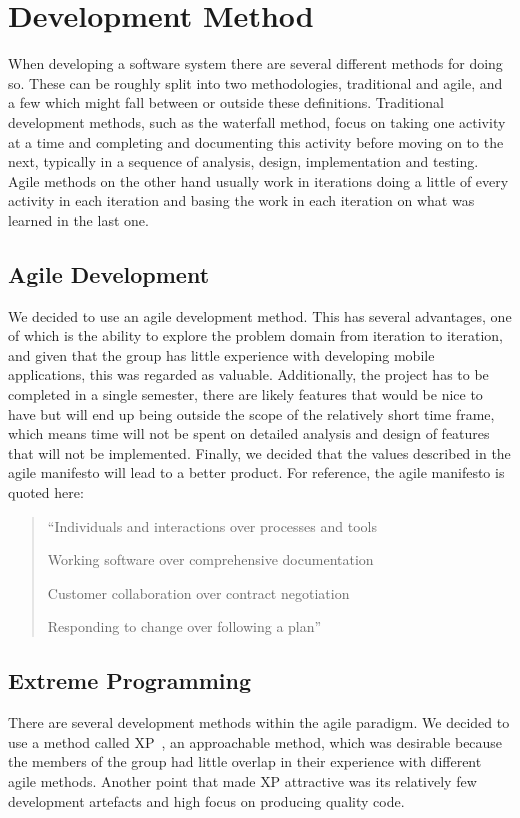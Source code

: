 \section{Development Method}
When developing a software system there are several different methods for doing so. These can be roughly split into two methodologies, traditional and agile, and a few which might fall between or outside these definitions. Traditional development methods, such as the waterfall method, focus on taking one activity at a time and completing and documenting this activity before moving on to the next, typically in a sequence of analysis, design, implementation and testing. Agile methods on the other hand usually work in iterations doing a little of every activity in each iteration and basing the work in each iteration on what was learned in the last one.

\subsection{Agile Development}
We decided to use an agile development method. This has several advantages, one of which is the ability to explore the problem domain from iteration to iteration, and given that the group has little experience with developing mobile applications, this was regarded as valuable. Additionally, the project has to be completed in a single semester, there are likely features that would be nice to have but will end up being outside the scope of the relatively short time frame, which means time will not be spent on detailed analysis and design of features that will not be implemented. Finally, we decided that the values described in the agile manifesto will lead to a better product. For reference, the agile manifesto is quoted here:

\begin{quotation}
``Individuals and interactions over processes and tools

Working software over comprehensive documentation

Customer collaboration over contract negotiation

Responding to change over following a plan''~\citep{shitmanifesto}
\end{quotation}

\subsection{Extreme Programming}
There are several development methods within the agile paradigm. We decided to use a method called \ac{XP}~\citep{beck04}, an approachable method, which was desirable because the members of the group had little overlap in their experience with different agile methods. Another point that made \ac{XP} attractive was its relatively few development artefacts and high focus on producing quality code.

